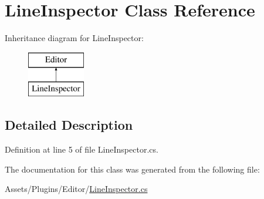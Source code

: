 \hypertarget{class_line_inspector}{}\section{Line\+Inspector Class Reference}
\label{class_line_inspector}
Inheritance diagram for Line\+Inspector\+:\begin{figure}[H]
\begin{center}
\leavevmode
\includegraphics[height=2.000000cm]{class_line_inspector}
\end{center}
\end{figure}


\subsection{Detailed Description}


Definition at line 5 of file Line\+Inspector.\+cs.



The documentation for this class was generated from the following file\+:\begin{DoxyCompactItemize}
\item 
Assets/\+Plugins/\+Editor/\mbox{\hyperlink{_line_inspector_8cs}{Line\+Inspector.\+cs}}\end{DoxyCompactItemize}
